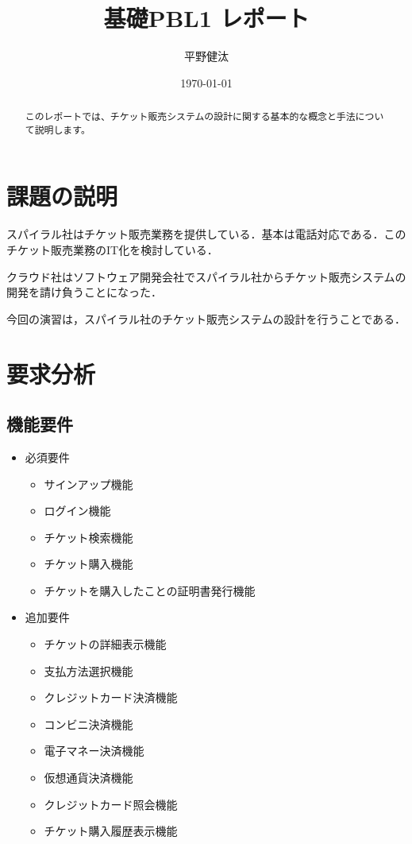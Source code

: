 \documentclass{ltjsarticle}
\title{基礎PBL1 レポート}
\author{平野健汰}
\date{\today}
\begin{document}
\maketitle

\begin{abstract}
このレポートでは、チケット販売システムの設計に関する基本的な概念と手法について説明します。
\end{abstract}

\section{課題の説明}
スパイラル社はチケット販売業務を提供している．基本は電話対応である．このチケット販売業務のIT化を検討している．

クラウド社はソフトウェア開発会社でスパイラル社からチケット販売システムの開発を請け負うことになった．

今回の演習は，スパイラル社のチケット販売システムの設計を行うことである．

\section{要求分析}
\subsection{機能要件}
\begin{itemize}
  \item 必須要件
  \begin{itemize}
    \item サインアップ機能
    \item ログイン機能
    \item チケット検索機能
    \item チケット購入機能
    \item チケットを購入したことの証明書発行機能
  \end{itemize}
  \item 追加要件
  \begin{itemize}
    \item チケットの詳細表示機能
    \item 支払方法選択機能
    \item クレジットカード決済機能
    \item コンビニ決済機能
    \item 電子マネー決済機能
    \item 仮想通貨決済機能
    \item クレジットカード照会機能
    \item チケット購入履歴表示機能
  \end{itemize}
\end{itemize}
\end{document}
